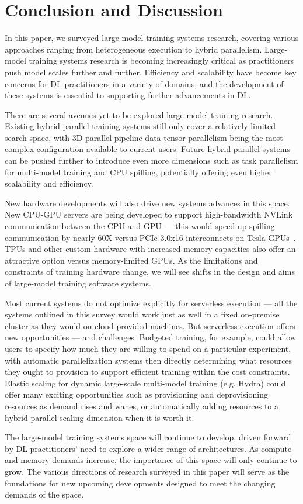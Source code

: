 
\section{Conclusion and Discussion}
\label{sec:conclusion}
In this paper, we surveyed large-model training systems research, covering various approaches ranging from heterogeneous execution to hybrid parallelism. Large-model training systems research is becoming increasingly critical as practitioners push model scales further and further. Efficiency and scalability have become key concerns for DL practitioners in a variety of domains, and the development of these systems is essential to supporting further advancements in DL.

There are several avenues yet to be explored large-model training research. Existing hybrid parallel training systems still only cover a relatively limited search space, with 3D parallel pipeline-data-tensor parallelism being the most complex configuration available to current users. Future hybrid parallel systems can be pushed further to introduce even more dimensions such as task parallelism for multi-model training and CPU spilling, potentially offering even higher scalability and efficiency.

New hardware developments will also drive new systems advances in this space. New CPU-GPU servers are being developed to support high-bandwidth NVLink communication between the CPU and GPU --- this would speed up spilling communication by nearly 60X versus PCIe 3.0x16 interconnects on Tesla GPUs~\cite{hopper2022}. TPUs and other custom hardware with increased memory capacities also offer an attractive option versus memory-limited GPUs. As the limitations and constraints of training hardware change, we will see shifts in the design and aims of large-model training software systems. 

Most current systems do not optimize explicitly for serverless execution --- all the systems outlined in this survey would work just as well in a fixed on-premise cluster as they would on cloud-provided machines. But serverless execution offers new opportunities --- and challenges. Budgeted training, for example, could allow users to specify how much they are willing to spend on a particular experiment, with automatic parallelization systems then directly determining what resources they ought to provision to support efficient training within the cost constraints. Elastic scaling for dynamic large-scale multi-model training (e.g. Hydra) could offer many exciting opportunities such as provisioning and deprovisioning resources as demand rises and wanes, or automatically adding resources to a hybrid parallel scaling dimension when it is worth it.

The large-model training systems space will continue to develop, driven forward by DL practitioners' need to explore a wider range of architectures. As compute and memory demands increase, the importance of this space will only continue to grow. The various directions of research surveyed in this paper will serve as the foundations for new upcoming developments designed to meet the changing demands of the space.